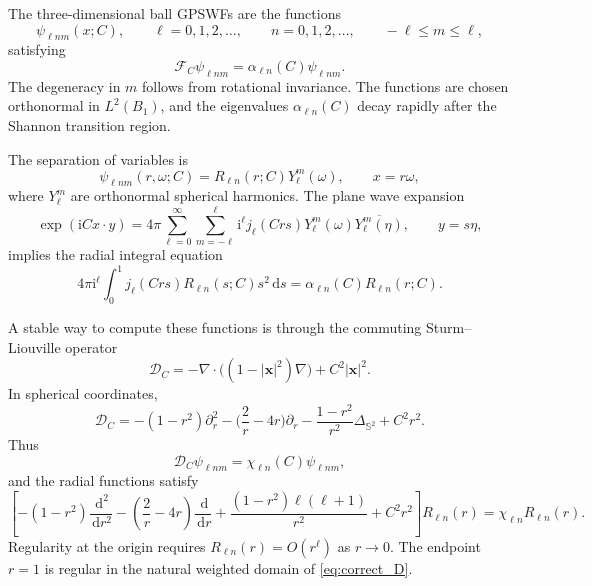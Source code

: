 \documentclass[11pt]{article}
\numberwithin{equation}{section}
\newcommand{\Sph}{\mathbb{S}}
\newcommand{\ii}{\mathrm{i}}
\newcommand{\dd}{\,\mathrm d}
\newcommand{\vect}[1]{\bm{#1}}
\newcommand{\F}{\mathcal{F}}
\newcommand{\Dop}{\mathcal{D}}
\newcommand{\abs}[1]{\left\lvert #1\right\rvert}
\theoremstyle{plain}
\theoremstyle{definition}
\begin{document}
The three-dimensional ball GPSWFs are the functions
\begin{equation*}
  \psi_{\ell n m}(x;C),
  \qquad \ell=0,1,2,\ldots,
  \qquad n=0,1,2,\ldots,
  \qquad -\ell\le m\le \ell,
\end{equation*}
satisfying
\begin{equation*}
  \F_C\psi_{\ell n m}=\alpha_{\ell n}(C)\psi_{\ell n m}.
\end{equation*}
The degeneracy in $m$ follows from rotational invariance.  The functions are chosen orthonormal in $L^2(B_1)$, and the eigenvalues $\alpha_{\ell n}(C)$ decay rapidly after the Shannon transition region.

The separation of variables is
\begin{equation*}
  \psi_{\ell n m}(r,\omega;C)=R_{\ell n}(r;C)Y_\ell^m(\omega),
  \qquad x=r\omega,
\end{equation*}
where $Y_\ell^m$ are orthonormal spherical harmonics.  The plane wave expansion
\begin{equation*}
  \exp(\ii Cx\cdot y)=4\pi\sum_{\ell=0}^\infty\sum_{m=-\ell}^{\ell}
  \ii^\ell j_\ell(Crs)Y_\ell^m(\omega)\overline{Y_\ell^m(\eta)},
  \qquad y=s\eta,
\end{equation*}
implies the radial integral equation
\begin{equation}\label{eq:radial_integral}
  4\pi\ii^\ell\int_0^1 j_\ell(Crs)R_{\ell n}(s;C)s^2\dd s
  =\alpha_{\ell n}(C)R_{\ell n}(r;C).
\end{equation}

A stable way to compute these functions is through the commuting Sturm--Liouville operator
\begin{equation}\label{eq:correct_D}
  \Dop_C=-\nabla\cdot\big((1-\abs{\vect{x}}^2)\nabla\big)+C^2\abs{\vect{x}}^2 .
\end{equation}
In spherical coordinates,
\begin{equation*}
  \Dop_C=-(1-r^2)\partial_r^2-\bigg(\frac{2}{r}-4r\bigg)\partial_r
  -\frac{1-r^2}{r^2}\Delta_{\Sph^2}+C^2r^2 .
\end{equation*}
Thus
\begin{equation*}
  \Dop_C\psi_{\ell n m}=\chi_{\ell n}(C)\psi_{\ell n m},
\end{equation*}
and the radial functions satisfy
\begin{equation*}
  \left[-(1-r^2)\frac{\dd^2}{\dd r^2}
 -\left(\frac{2}{r}-4r\right)\frac{\dd}{\dd r}
 +\frac{(1-r^2)\ell(\ell+1)}{r^2}+C^2r^2\right]R_{\ell n}(r)
 =\chi_{\ell n}R_{\ell n}(r).
\end{equation*}
Regularity at the origin requires $R_{\ell n}(r)=O(r^\ell)$ as $r\to0$.  The endpoint $r=1$ is regular in the natural weighted domain of \eqref{eq:correct_D}.
\end{document}
